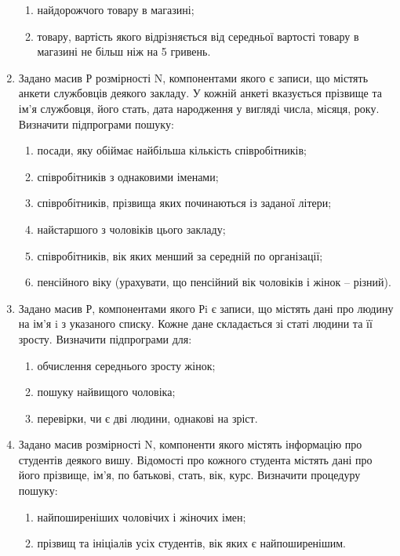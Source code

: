 \documentclass[]{article}
\makeatletter
\newcommand{\xslalph}[1]{\expandafter\@xslalph\csname c@#1\endcsname}
\newcommand{\@xslalph}[1]{%
    \ifcase#1\or а\or б\or в\or г\or д\or e\or є\or ж\or з\or i%
    \or й\or к\or л\or м\or н\or о\or п\or р\or с\or т%
    \or у\or ф\or х\or ц\or ч\or ш\or ю\or я\or аа\or бб\or вв %
    \else\@ctrerr\fi%
}
\makeatother
\begin{document}
\begin{enumerate}
\begin{enumerate}[label=\xslalph*)]
\item найдорожчого товару в магазині;

\item товару, вартість якого відрізняється від середньої вартості товару
в магазині не більш ніж на 5 гривень.
\end{enumerate}

\item
Задано масив Р розмірності N, компонентами якого є записи,
що містять анкети службовців деякого закладу. У кожній анкеті вказується
прізвище та ім'я службовця, його стать, дата народження у вигляді числа,
місяця, року. Визначити підпрограми пошуку:
\begin{enumerate}[label=\xslalph*)]

\item посади, яку обіймає найбільша кількість співробітників;

\item  співробітників з однаковими іменами;

\item  співробітників, прізвища яких починаються із заданої літери;

\item  найстаршого з чоловіків цього закладу;

\item  співробітників, вік яких менший за середній по організації;

\item  пенсійного віку (урахувати, що пенсійний вік чоловіків і жінок --
різний).
\end{enumerate}

\item
Задано масив Р, компонентами якого Рi є записи, що містять дані про
людину на ім'я i з указаного списку. Кожне дане складається зі статі
людини та її зросту. Визначити підпрограми для:
\begin{enumerate}[label=\xslalph*)]

\item обчислення середнього зросту жінок;

\item пошуку найвищого чоловіка;

\item перевірки, чи є дві людини, однакові на зріст.
\end{enumerate}
\item
Задано масив розмірності N, компоненти якого містять інформацію про
студентів деякого вишу. Відомості про кожного студента містять дані про
його прізвище, ім'я, по батькові, стать, вік, курс. Визначити процедуру
пошуку:
\begin{enumerate}[label=\xslalph*)]
\item
найпоширеніших чоловічих і жіночих імен;
\item
прізвищ та ініціалів усіх студентів, вік яких є найпоширенішим.
\end{enumerate}


\end{enumerate}
\end{document}
